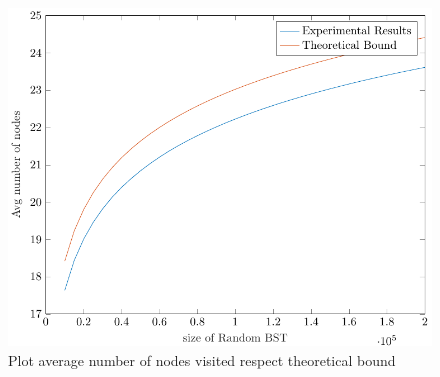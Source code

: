 \begin{figure}
    \centering
    \includegraphics[scale=0.65]{plotInsertion.pdf}
    \caption{Plot average number of nodes visited respect theoretical bound}
    \label{fig:plotBoundIns}
\end{figure}


